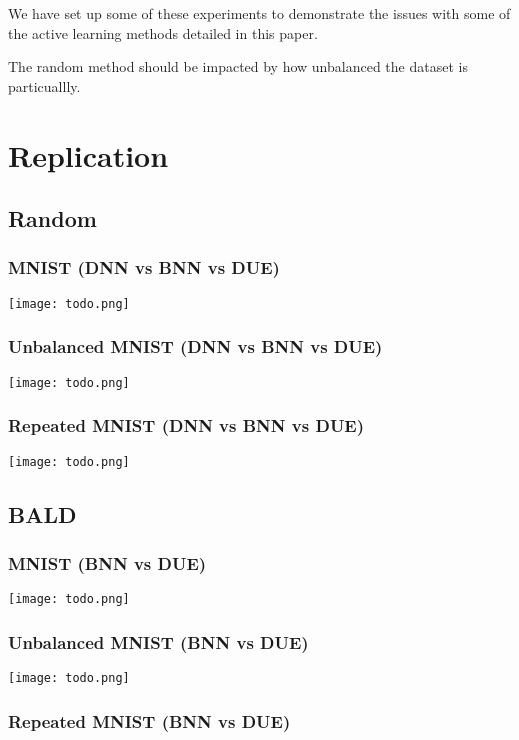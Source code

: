 \documentclass[12pt, a4paper]{report}
\theoremstyle{definition}
\begin{document}
We have set up some of these experiments to demonstrate the issues with some of the active learning methods detailed in this paper.

The random method should be impacted by how unbalanced the dataset is particuallly.

\section{Replication}

\subsection{Random}

\subsubsection{MNIST (DNN vs BNN vs DUE)}

\texttt{[image: todo.png]}

\subsubsection{Unbalanced MNIST (DNN vs BNN vs DUE)}

\texttt{[image: todo.png]}

\subsubsection{Repeated MNIST (DNN vs BNN vs DUE)}

\texttt{[image: todo.png]}

\subsection{BALD}

\subsubsection{MNIST (BNN vs DUE)}

\texttt{[image: todo.png]}

\subsubsection{Unbalanced MNIST (BNN vs DUE)}

\texttt{[image: todo.png]}

\subsubsection{Repeated MNIST (BNN vs DUE)}
\end{document}
